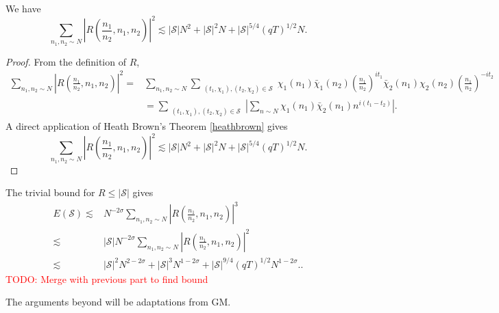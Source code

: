 \begin{lemma}
    We have 
\[
        \sum_{n_1,n_2\sim N}\left|R\left(\frac{n_1}{n_2},n_1,n_2\right) \right|^2\lesssim |\mathcal{S}|N^2+ |\mathcal{S}|^2N + |\mathcal{S}|^{5/4}(qT)^{1/2}N.
    \]
\end{lemma}
\begin{proof}
    From the definition of $R$, \begin{align*}
        \sum_{n_1,n_2\sim N}\left|R\left(\frac{n_1}{n_2},n_1,n_2\right) \right|^2=& \sum_{n_1,n_2\sim N}\sum_{\substack{(t_1,\chi_1),(t_2,\chi_2)\in \mathcal{S}}}
        \chi_1(n_1)\bar{\chi}_1(n_2)\left(\frac{n_1}{n_2}\right)^{it_1}\bar{\chi}_2(n_1){\chi}_2(n_2)\left(\frac{n_1}{n_2}\right)^{-it_2}
        \\
        &=\sum_{\substack{(t_1,\chi_1),(t_2,\chi_2)\in \mathcal{S}}}\left|\sum_{n\sim N}
        \chi_1(n_1)\bar{\chi}_2(n_1)n^{i(t_1-t_2)}\right|.
    \end{align*}
    A direct application of Heath Brown's Theorem \ref{heathbrown} gives \[
        \sum_{n_1,n_2\sim N}\left|R\left(\frac{n_1}{n_2},n_1,n_2\right) \right|^2\lesssim |\mathcal{S}|N^2+ |\mathcal{S}|^2N + |\mathcal{S}|^{5/4}(qT)^{1/2}N.
    \]
\end{proof}
The trivial bound for $R\leq |\mathcal{S}|$ gives \begin{align*}
    E(\mathcal{S})\lesssim& N^{-2\sigma}\sum_{n_1,n_2\sim N}\left|R\left(\frac{n_1}{n_2},n_1,n_2\right) \right|^3\\
    \lesssim &|\mathcal{S}|N^{-2\sigma}\sum_{n_1,n_2\sim N}\left|R\left(\frac{n_1}{n_2},n_1,n_2\right) \right|^2\\
    \lesssim& |\mathcal{S}|^2N^{2-2\sigma}+ |\mathcal{S}|^3N^{1-2\sigma} + |\mathcal{S}|^{9/4}(qT)^{1/2}N^{{1-2\sigma}}..
\end{align*}
\textcolor{red}{TODO: Merge with previous part to find bound}

The arguments beyond will be adaptations from GM. 

